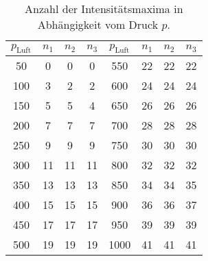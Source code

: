 \begin{table}
  \centering
  \caption{Anzahl der Intensitätsmaxima in Abhängigkeit vom Druck $p$.}
  \label{tabular_04}
  \begin{tabular}{c c c c |  c c c c}
    \toprule
   \multicolumn{1}{c}{$p_\text{Luft}$} & \multicolumn{1}{c}{$n_1$} & \multicolumn{1}{c}{$n_2$} & \multicolumn{1}{c}{$n_3$}
   & \multicolumn{1}{c}{$p_\text{Luft}$} & \multicolumn{1}{c}{$n_1$} & \multicolumn{1}{c}{$n_2$} & \multicolumn{1}{c}{$n_3$}\\
   \midrule
    \num{50 } & \num{0 } & \num{0 } & \num{0 } & \num{550 } & \num{22} & \num{22} & \num{22} \\
    \num{100} & \num{3 } & \num{2 } & \num{2 } & \num{600 } & \num{24} & \num{24} & \num{24} \\
    \num{150} & \num{5 } & \num{5 } & \num{4 } & \num{650 } & \num{26} & \num{26} & \num{26} \\
    \num{200} & \num{7 } & \num{7 } & \num{7 } & \num{700 } & \num{28} & \num{28} & \num{28} \\
    \num{250} & \num{9 } & \num{9 } & \num{9 } & \num{750 } & \num{30} & \num{30} & \num{30} \\
    \num{300} & \num{11} & \num{11} & \num{11} & \num{800 } & \num{32} & \num{32} & \num{32} \\
    \num{350} & \num{13} & \num{13} & \num{13} & \num{850 } & \num{34} & \num{34} & \num{35} \\
    \num{400} & \num{15} & \num{15} & \num{15} & \num{900 } & \num{36} & \num{36} & \num{37} \\
    \num{450} & \num{17} & \num{17} & \num{17} & \num{950 } & \num{39} & \num{39} & \num{39} \\
    \num{500} & \num{19} & \num{19} & \num{19} & \num{1000} & \num{41} & \num{41} & \num{41} \\
\bottomrule
  \end{tabular}
\end{table}
